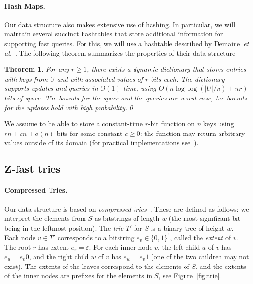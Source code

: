 \documentclass[a4paper,11pt]{article}
\newtheorem{theorem} {Theorem}[section]
\newcommand{\eps}{\varepsilon}
\newcommand{\etal}{\emph{et al.}\xspace}
\newcommand{\?}{\mskip1.5mu}
\begin{document}
\paragraph{Hash Maps.}
Our data structure also makes extensive use of
hashing. In particular, we will maintain several
succinct hashtables that store additional
information for supporting fast queries.
For this, we will use a hashtable described
by Demaine~\etal~\cite{DemaineMePaPa06}.
The following theorem summarizes the properties
of their data structure.

\begin{theorem}\label{thm:succinct_retrieval_only_hashtable}
For any $r \geq 1$, there exists a dynamic dictionary that
stores entries with keys from $U$ and with associated
values of $r$ bits each.
The dictionary supports updates and queries in $O(1)$ time,
using $O(n \log\log (|U|/n) + nr)$ \emph{bits} of space.
The bounds for the space and the queries are
worst-case, the bounds for the updates hold with
high probability.\qed
\end{theorem}

We assume to be able to store a constant-time $r$-bit function on $n$ keys using
$rn+cn +o(n)$ bits for some constant $c\geq 0$: the function may return
arbitrary values outside of its domain (for practical implementations
see~\cite{BelazzouguiBoPaVi11}).



\subsection{Z-fast tries} 

\paragraph{Compressed Tries.}
Our data structure is based on \emph{compressed
tries}~\cite{CormenLeRiSt09,Knuth98}. These are defined as
follows: we interpret the elements from $S$ as bitstrings 
of length $w$ (the most significant bit being in the leftmost
position). The \emph{trie} $T'$ for $S$ is a binary tree
of height $w$. Each node $v \in T'$ corresponds
to a bitstring $e_v \in \{0,1\}^*$, called the \emph{extent} of $v$. 
The root $r$ has extent $e_r = \eps$. For each inner node $v$, the left
child $u$ of $v$  has $e_u = e_v0$, and the
right child $w$ of $v$ has $e_w = e_v1$ (one of the
two children may not exist). The extents of the 
leaves correspond to the elements of $S$, and
the extents of the inner nodes are prefixes
for the elements in $S$, see Figure~\ref{fig:trie}.
\end{document}
